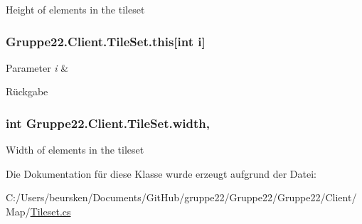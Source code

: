 Height of elements in the tileset 

\hypertarget{class_gruppe22_1_1_client_1_1_tile_set_a5182218935ec1904b9160d37b8ece9c2}{
\subsubsection[{this[int i]}]{ Gruppe22.\-Client.\-Tile\-Set.\-this\mbox{[}int i\mbox{]}\hspace{0.3cm}{\ttfamily [get]}}}\label{class_gruppe22_1_1_client_1_1_tile_set_a5182218935ec1904b9160d37b8ece9c2}





\begin{DoxyParams}{Parameter}
{\em i} & \\
\hline
\end{DoxyParams}
\begin{DoxyReturn}{Rückgabe}

\end{DoxyReturn}
\hypertarget{class_gruppe22_1_1_client_1_1_tile_set_aff0371f9e4071f24de16612c2066ad5b}{
\subsubsection[{width}]{\setlength{\rightskip}{0pt plus 5cm}int Gruppe22.\-Client.\-Tile\-Set.\-width\hspace{0.3cm}{\ttfamily [get]}, {\ttfamily [set]}}}\label{class_gruppe22_1_1_client_1_1_tile_set_aff0371f9e4071f24de16612c2066ad5b}


Width of elements in the tileset 



Die Dokumentation für diese Klasse wurde erzeugt aufgrund der Datei\-:\begin{DoxyCompactItemize}
\item 
C\-:/\-Users/beursken/\-Documents/\-Git\-Hub/gruppe22/\-Gruppe22/\-Gruppe22/\-Client/\-Map/\hyperlink{_tileset_8cs}{Tileset.\-cs}\end{DoxyCompactItemize}
